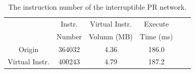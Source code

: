 

  
  


\begin{table}[t]
  \small
  \centering
  \caption{The instruction number of the interruptible PR network. }
\begin{tabular}{|c|c|c|c|c|c|}
  \hline
         & Instr.  & Virtual Instr. & Execute \bigstrut[t]\\
        & Number   & Volunm (MB) & Time (ms) \bigstrut[b]\\
  \hline
  Origin   &      364032      & 4.36 & 186.0 \bigstrut\\
  \hline
  Virtual Instr.   &     400243    & 4.79 & 187.2 \bigstrut\\
  \hline
  \end{tabular}%
  \label{tab:instrnum}%
\end{table}%




